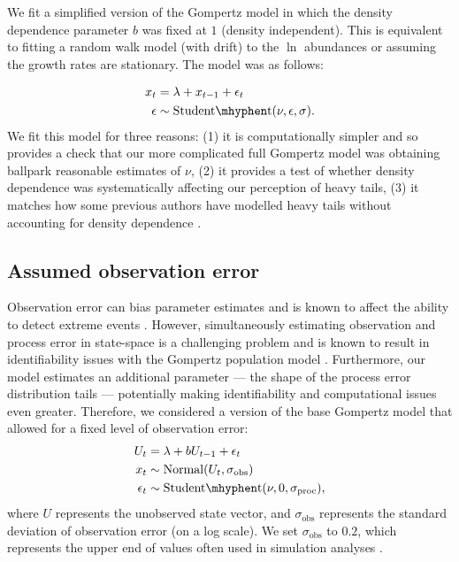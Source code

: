 We fit a simplified version of the Gompertz model in which the density dependence parameter $b$ was fixed at $1$ (density independent). This is equivalent to fitting a random walk model (with drift) to the $\ln$ abundances or assuming the growth rates are stationary. The model was as follows: 

\begin{align*}
x_t &= \lambda + x_{t-1} + \epsilon_t\\
\epsilon &\sim \mathrm{Student\mhyphen t}(\nu, \epsilon, \sigma).
\end{align*}
We fit this model for three reasons: (1) it is computationally simpler and so provides a check that our more complicated full Gompertz model was obtaining ballpark reasonable estimates of $\nu$, (2) it provides a test of whether density dependence was systematically affecting our perception of heavy tails, (3) it matches how some previous authors have modelled heavy tails without accounting for density dependence \citep{segura2013}.

\subsection{Assumed observation error}

Observation error can bias parameter estimates \citep[e.g.][]{knape2012} and is known to affect the ability to detect extreme events \citep{ward2007}. However, simultaneously estimating observation and process error in state-space is a challenging problem and is known to result in identifiability issues with the Gompertz population model \citep{knape2008}. Furthermore, our model estimates an additional parameter --- the shape of the process error distribution tails --- potentially making identifiability and computational issues even greater. Therefore, we considered a version of the base Gompertz model that allowed for a fixed level of observation error:
\begin{align*}
U_t &= \lambda + b U_{t-1} + \epsilon_t\\
x_t &\sim \mathrm{Normal}(U_t, \sigma_\mathrm{obs})\\
\epsilon_t &\sim \mathrm{Student\mhyphen t}(\nu, 0, \sigma_\mathrm{proc}),
\end{align*}
where $U$ represents the unobserved state vector, and $\sigma_\mathrm{obs}$ represents the standard deviation of observation error (on a log scale). We set $\sigma_\mathrm{obs}$ to $0.2$, which represents the upper end of values often used in simulation analyses \citep[e.g.][]{valpine2002, thorson2014b}.

